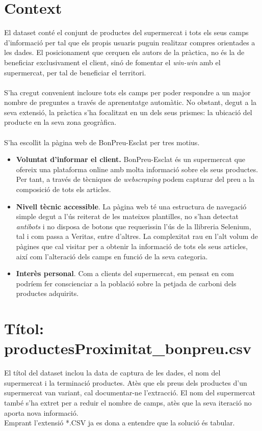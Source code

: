 \documentclass[]{scrartcl}
\begin{document}
\section{Context}
El dataset conté el conjunt de productes del supermercat i tots els seus camps d'informació per tal que els propis usuaris puguin realitzar compres orientades a les dades. El posicionament que cerquen els autors de la pràctica, no és la de beneficiar exclusivament el client, sinó de fomentar el \textit{win-win} amb el supermercat, per tal de beneficiar el territori. 
\\\\S'ha cregut convenient incloure tots els camps per poder respondre a un major nombre de preguntes a través de aprenentatge automàtic. No obstant, degut a la seva extensió, la pràctica s'ha focalitzat en un dels seus prismes: la ubicació del producte en la seva zona geogràfica.
\\\\
S'ha escollit la pàgina web de BonPreu-Esclat per tres motius. 
\begin{itemize}
	\item \textbf{Voluntat d'informar el client.} BonPreu-Esclat és un supermercat que ofereix una plataforma online amb molta informació sobre els seus productes. Per tant, a través de tècniques de \textit{webscraping} podem capturar del preu a la composició de tots els articles.
	\item \textbf{Nivell tècnic accessible}. La pàgina web té una estructura de navegació simple degut a l'ús reiterat de les mateixes plantilles, no s'han detectat \textit{antibots} i no disposa de botons que requerissin l'ús de la llibreria Selenium, tal i com passa a Veritas, entre d'altres. La complexitat rau en l'alt volum de pàgines que cal visitar per a obtenir la informació de tots els seus articles, així com l'alteració dels camps en funció de la seva categoria.
	\item \textbf{Interès personal}. Com a clients del supermercat, em pensat en com podríem fer conscienciar a la població sobre la petjada de carboni dels productes adquirits.
\end{itemize}

\section{Títol: productesProximitat\_bonpreu.csv}
El títol del dataset inclou la data de captura de les dades, el nom del supermercat i la terminació productes.
Atès que els preus dels productes d'un supermercat van variant, cal documentar-ne l'extracció.
El nom del supermercat també s'ha extret per a reduir el nombre de camps, atès que la seva iteració no aporta nova informació. 
\\Emprant l'extensió *.CSV ja es dona a entendre que la solució és tabular.
\end{document}
